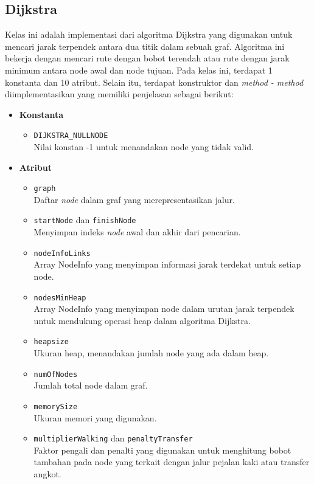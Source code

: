 \subsection{Dijkstra}
Kelas ini adalah implementasi dari algoritma Dijkstra yang digunakan untuk mencari jarak terpendek antara dua titik dalam sebuah graf. Algoritma ini bekerja dengan mencari rute dengan bobot terendah atau rute dengan jarak minimum antara node awal dan node tujuan. Pada kelas ini, terdapat 1 konstanta dan 10 atribut. Selain itu, terdapat konstruktor dan \textit{method - method} diimplementasikan yang memiliki penjelasan sebagai berikut:
\begin{itemize}
    \item \textbf{Konstanta}
    \begin{itemize}
        \item \texttt{DIJKSTRA\_NULLNODE}
        \\ Nilai konstan -1 untuk menandakan node yang tidak valid.
    \end{itemize}

    \item \textbf{Atribut}
    \begin{itemize}
        \item \texttt{graph}
        \\ Daftar \textit{node} dalam graf yang merepresentasikan jalur.
        \item \texttt{startNode} dan \texttt{finishNode}
        \\ Menyimpan indeks \textit{node} awal dan akhir dari pencarian.
        \item \texttt{nodeInfoLinks}
        \\ Array NodeInfo yang menyimpan informasi jarak terdekat untuk setiap node.
        \item \texttt{nodesMinHeap}
        \\ Array NodeInfo yang menyimpan node dalam urutan jarak terpendek untuk mendukung operasi heap dalam algoritma Dijkstra.
        \item \texttt{heapsize}
        \\ Ukuran heap, menandakan jumlah node yang ada dalam heap.
        \item \texttt{numOfNodes}
        \\ Jumlah total node dalam graf.
        \item \texttt{memorySize}
        \\ Ukuran memori yang digunakan.
        \item \texttt{multiplierWalking} dan \texttt{penaltyTransfer}
        \\ Faktor pengali dan penalti yang digunakan untuk menghitung bobot tambahan pada node yang terkait dengan jalur pejalan kaki atau transfer angkot.
    \end{itemize}


\end{itemize}
